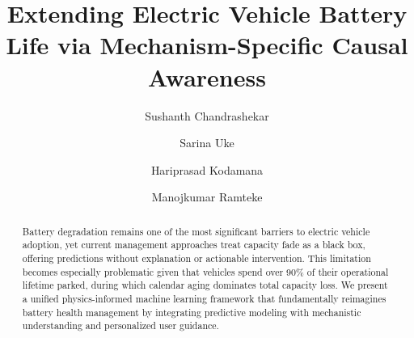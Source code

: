 \documentclass[5p,times,authoryear]{elsarticle}
\begin{document}
\sloppy

\begin{frontmatter}

\title{Extending Electric Vehicle Battery Life via Mechanism-Specific Causal Awareness}

\author[uvce]{Sushanth Chandrashekar}
\author[ese]{Sarina Uke}
\author[iitd1,iitd2]{Hariprasad Kodamana}
\author[iitd1,iitd2]{Manojkumar Ramteke}





\begin{abstract}
Battery degradation remains one of the most significant barriers to electric vehicle adoption, yet current management approaches treat capacity fade as a black box, offering predictions without explanation or actionable intervention. This limitation becomes especially problematic given that vehicles spend over 90\% of their operational lifetime parked, during which calendar aging dominates total capacity loss. We present a unified physics-informed machine learning framework that fundamentally reimagines battery health management by integrating predictive modeling with mechanistic understanding and personalized user guidance.


\end{abstract}
\end{frontmatter}
\end{document}
